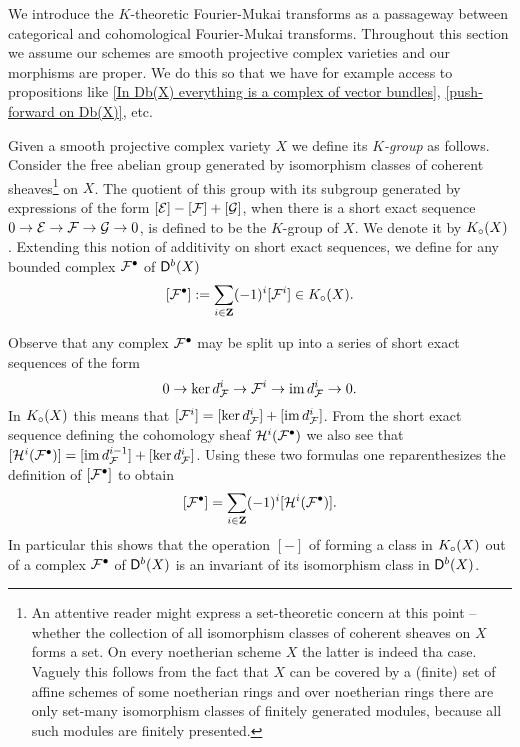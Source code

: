 We introduce the $K$-theoretic Fourier-Mukai transforms as a passageway between categorical and cohomological Fourier-Mukai transforms. Throughout this section we assume our schemes are smooth projective complex varieties and our morphisms are proper. We do this so that we have for example access to propositions like \ref{In Db(X) everything is a complex of vector bundles}, \ref{push-forward on Db(X)}, etc.

Given a smooth projective complex variety $X$ we define its \emph{$K$-group} as follows. Consider the free abelian group generated by isomorphism classes of coherent sheaves\footnote{
    An attentive reader might express a set-theoretic concern at this point -- whether the collection of all isomorphism classes of coherent sheaves on $X$ forms a set. On every noetherian scheme $X$ the latter is indeed tha case. Vaguely this follows from the fact that $X$ can be covered by a (finite) set of affine schemes of some noetherian rings and over noetherian rings there are only set-many isomorphism classes of finitely generated modules, because all such modules are finitely presented. 
} on $X$. The quotient of this group with its subgroup generated by expressions of the form $[\mathcal E] - [\mathcal F] + [\mathcal G]$, when there is a short exact sequence $0 \to \mathcal E \to \mathcal F \to \mathcal G \to 0$, is defined to be the $K$-group of $X$. We denote it by $K_{\circ}(X)$. Extending this notion of additivity on short exact sequences, we define for any bounded complex $\mathcal F^\bullet$ of $\mathsf{D}^b(X)$ 
\[
    [\mathcal F^\bullet] := \sum_{i \in \mathbf Z}(-1)^i[\mathcal F^i] \in K_{\circ}(X).
\]
\begin{remark}
    Observe that any complex $\mathcal F^\bullet$ may be split up into a series of short exact sequences of the form
    \[
        0 \to \ker d^{i}_\mathcal F \to \mathcal F^i \to \operatorname{im} d^i_\mathcal F \to 0.
    \]
    In $K_{\circ}(X)$ this means that $[\mathcal F^i] = [\ker d^{i}_\mathcal F] + [\operatorname{im} d^i_\mathcal F]$. From the short exact sequence defining the cohomology sheaf  $\mathcal H^i(\mathcal F^\bullet)$ we also see that $[\mathcal H^i(\mathcal F^\bullet)] = [\operatorname{im} d^{i-1}_\mathcal F] + [\ker d^{i}_\mathcal F]$. Using these two formulas one reparenthesizes the definition of $[\mathcal F^\bullet]$ to obtain
    \begin{equation}
        \label{eq: K-class alternating sum of cohomology}
        [\mathcal F^\bullet] = \sum_{i \in \mathbf Z}(-1)^i[\mathcal H^i(\mathcal F^\bullet)].
    \end{equation}
    In particular this shows that the operation $[-]$ of forming a class in $K_{\circ}(X)$ out of a complex $\mathcal F^\bullet$ of $\mathsf{D}^b(X)$ is an invariant of its isomorphism class in $\mathsf{D}^b(X)$.
\end{remark}


